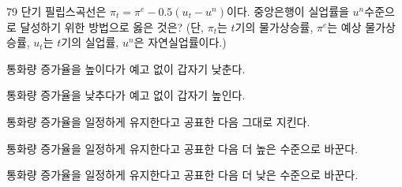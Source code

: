 \begin{question}{79}
단기 필립스곡선은 $\pi_{ t } = \pi^{ e } -0.5(u_{ t } -u^{ n } )$이다. 중앙은행이 실업률을 $u^{ n }$수준으로 달성하기 위한 방법으로 옳은 것은? (단, $\pi_{ t }$는 $t$기의 물가상승률, $\pi^{ e }$는 예상 물가상승률, $u_{ t }$는 $t$기의 실업률, $u^{ n }$은 자연실업률이다.)
\begin{choices}
  \item 통화량 증가율을 높이다가 예고 없이 갑자기 낮춘다.
  \item 통화량 증가율을 낮추다가 예고 없이 갑자기 높인다.
  \item 통화량 증가율을 일정하게 유지한다고 공표한 다음 그대로 지킨다.
  \item 통화량 증가율을 일정하게 유지한다고 공표한 다음 더 높은 수준으로 바꾼다.
  \item 통화량 증가율을 일정하게 유지한다고 공표한 다음 더 낮은 수준으로 바꾼다.
\end{choices}
\end{question}
